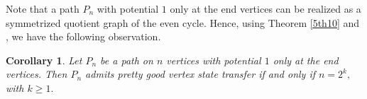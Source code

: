 \documentclass[12pt,a4paper]{article}
\newtheorem{thm}{Theorem}
\newtheorem{cor}{Corollary}
\begin{document}
Note that a path $P_n$ with potential $1$ only at the end vertices can
 be realized as a symmetrized quotient graph of the even cycle. Hence,  using Theorem \ref{5th10} and \cite[Remark 5]{god8}, we have the following observation.

 \begin{cor}
     Let $P_n$ be a path on $n$ vertices with potential $1$ only at the end vertices. Then $P_n$ admits pretty good vertex state transfer if and only if $n=2^k,$ with $k\geq 1.$
 \end{cor}
\end{document}
